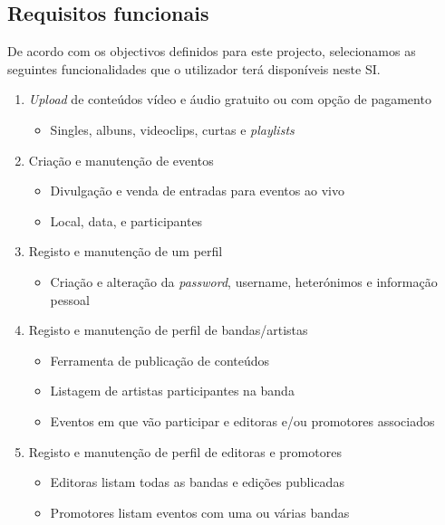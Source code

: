 \documentclass[12pt, a4paper, twoside]{report} %
\begin{document}
\subsection{Requisitos funcionais}

De acordo com os objectivos definidos para este projecto, selecionamos as seguintes funcionalidades que o utilizador terá disponíveis neste SI.

\begin{enumerate}

\item \textit{Upload} de conteúdos vídeo e áudio gratuito ou com opção de pagamento
	\begin{itemize}
	\item Singles, albuns, videoclips, curtas e \textit{playlists}
	\end{itemize}
	
\item Criação e manutenção de eventos
    \begin{itemize}
    \item Divulgação e venda de entradas para eventos ao vivo
    \item Local, data, e participantes
    \end{itemize}
    
\item Registo e manutenção de um perfil
	\begin{itemize}
	\item Criação  e alteração da \textit{password}, username, heterónimos e informação pessoal
	\end{itemize}

\item Registo e manutenção de perfil de bandas/artistas
    \begin{itemize}
    \item Ferramenta de publicação de conteúdos
    \item Listagem de artistas participantes na banda
    \item Eventos em que vão participar e editoras e/ou promotores associados
    \end{itemize}
    
\item Registo e manutenção de perfil de editoras e promotores
	\begin{itemize}
	\item Editoras listam todas as bandas e edições publicadas
    \item Promotores listam eventos com uma ou várias bandas
	\end{itemize}
	

\end{enumerate}
\end{document}
